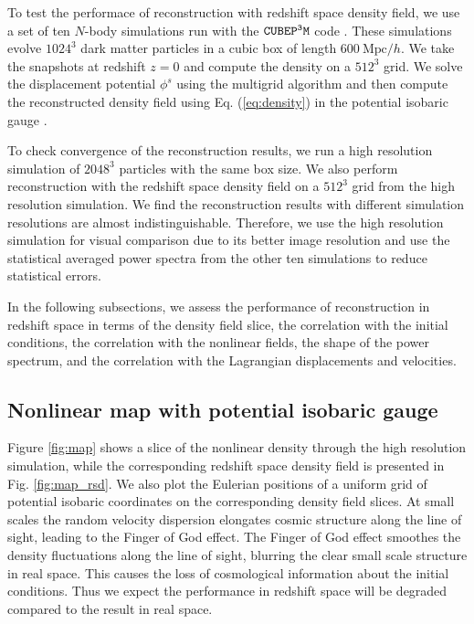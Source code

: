 \documentclass[aps,prd,twocolumn,superscriptaddress,groupedaddress,nofootinbib,amsfont]{revtex4}  %
\newcommand{\mr}{\mathrm}
\begin{document}
To test the performace of reconstruction with redshift space density field, 
we use a set of ten $N$-body simulations run with the ${\tt CUBEP^3M}$ code 
\cite{2013code}. These simulations evolve $1024^3$ dark matter particles in 
a cubic box of length $600\ \mr{Mpc}/h$.
We take the snapshots at redshift $z=0$ and compute the density on a $512^3$ 
grid. We solve the displacement potential $\phi^s$ using the multigrid algorithm
and then compute the reconstructed density field using Eq. (\ref{eq:density}) 
in the potential isobaric gauge \cite{2016HMZ}.

To check convergence of the reconstruction results, we run a high resolution
simulation of $2048^3$ particles with the same box size. 
We also perform reconstruction with the redshift space density field on a $512^3$ grid from the high resolution simulation. We find the reconstruction results 
with different simulation resolutions are almost indistinguishable. 
Therefore, we use the high resolution simulation for visual comparison due to
its better image resolution and use the statistical averaged power spectra from
the other ten simulations to reduce statistical errors.

In the following subsections, we assess the performance of reconstruction in 
redshift space in terms of the density field slice, the correlation with the
initial conditions, the correlation with the nonlinear fields, the shape of 
the power spectrum, and the correlation with the Lagrangian displacements and 
velocities.

\subsection{Nonlinear map with potential isobaric gauge}

Figure \ref{fig:map} shows a slice of the nonlinear density through the high
resolution simulation, while the corresponding redshift space density field is 
presented in Fig. \ref{fig:map_rsd}.
We also plot the Eulerian positions of a uniform grid of potential isobaric 
coordinates on the corresponding density field slices.
At small scales the random velocity dispersion elongates cosmic structure 
along the line of sight, leading to the Finger of God effect.
The Finger of God effect smoothes the density fluctuations along the line of 
sight, blurring the clear small scale structure in real space.
This causes the loss of cosmological information about the initial conditions.
Thus we expect the performance in redshift space will be degraded compared to
the result in real space.
\end{document}
